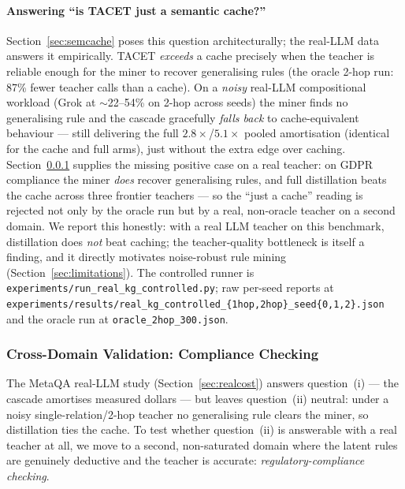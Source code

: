 \documentclass[11pt]{article}
\theoremstyle{plain}
\begin{document}
\paragraph{Answering ``is TACET just a semantic cache?''} Section~\ref{sec:semcache}
poses this question architecturally; the real-LLM data answers it empirically.
TACET \emph{exceeds} a cache precisely when the teacher is reliable enough for
the miner to recover generalising rules (the oracle 2-hop run: 87\% fewer
teacher calls than a cache). On a \emph{noisy} real-LLM compositional workload
(Grok at $\sim$22--54\% on 2-hop across seeds) the miner finds no generalising
rule and the cascade gracefully \emph{falls back} to cache-equivalent behaviour
--- still delivering the full $2.8\times$/$5.1\times$ pooled amortisation
(identical for the cache and full arms), just without the extra edge over
caching. Section~\ref{sec:compliance} supplies the missing positive case on a real
teacher: on GDPR compliance the miner \emph{does} recover generalising rules,
and full distillation beats the cache across three frontier teachers --- so the
``just a cache'' reading is rejected not only by the oracle run but by a real,
non-oracle teacher on a second domain. We report this honestly: with a real LLM teacher on this
benchmark, distillation does \emph{not} beat caching; the teacher-quality
bottleneck is itself a finding, and it directly motivates noise-robust rule
mining (Section~\ref{sec:limitations}). The controlled runner is
\texttt{experiments/run\_real\_kg\_controlled.py}; raw per-seed reports at
\texttt{experiments/results/real\_kg\_controlled\_\{1hop,2hop\}\_seed\{0,1,2\}.json}
and the oracle run at \texttt{oracle\_2hop\_300.json}.

\subsubsection{Cross-Domain Validation: Compliance Checking}
\label{sec:compliance}
The MetaQA real-LLM study (Section~\ref{sec:realcost}) answers question~(i) ---
the cascade amortises measured dollars --- but leaves question~(ii) neutral:
under a noisy single-relation/2-hop teacher no generalising rule clears the
miner, so distillation ties the cache. To test whether question~(ii) is
answerable with a real teacher at all, we move to a second, non-saturated
domain where the latent rules are genuinely deductive and the teacher is
accurate: \emph{regulatory-compliance checking}.
\end{document}
